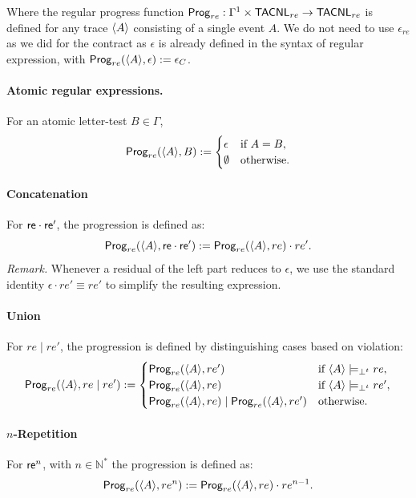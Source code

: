 \begin{definition}
Where the regular progress function $\mathsf{Prog}_{re}: \Gamma^1 \times \mathsf{TACNL}_{re} \to \mathsf{TACNL}_{re} $ is defined for any trace $\langle A \rangle $ consisting of a single event $A$.
 We do not need to use $\epsilon_{re}$ as we did for the contract as $\epsilon$ is already defined in the syntax of regular expression, with $\mathsf{Prog}_{re}(\langle A \rangle ,\epsilon):= \epsilon_C$.

 \paragraph{Atomic regular expressions.}
 For an atomic letter-test $B \in \Gamma$,
 \[
 \mathsf{Prog}_{re}(\langle A \rangle , B) :=
 \begin{cases}
 \epsilon & \text{if } A = B,\\
 \emptyset & \text{otherwise}.
 \end{cases}
 \]
  
 \paragraph{Concatenation}
For $\mathsf{re} \cdot \mathsf{re}'$, the progression is defined as:
\[
\mathsf{Prog}_{re}(\langle A \rangle , \mathsf{re} \cdot \mathsf{re}') := 
    \mathsf{Prog}_{re}(\langle A \rangle , re) \cdot re'.
\]
\noindent\emph{Remark.} Whenever a residual of the left part reduces to $\epsilon$, we use the standard identity $\epsilon \cdot re' \equiv re'$ to simplify the resulting expression.



\paragraph{Union}
For $re \mid re'$, the progression is defined by distinguishing cases based on violation:
\[
\mathsf{Prog}_{re}(\langle A \rangle , re \mid re') := \begin{cases} 
\mathsf{Prog}_{re}(\langle A \rangle , re') & \text{if } \langle A \rangle  \models_{\bot^t} re ,\\
\mathsf{Prog}_{re}(\langle A \rangle , re) & \text{if } \langle A \rangle  \models_{\bot^t} re' ,\\
\mathsf{Prog}_{re}(\langle A \rangle , re) \mid \mathsf{Prog}_{re}(\langle A \rangle , re') & \text{otherwise}.
\end{cases}
\]

\paragraph{$n$-Repetition}
For $\mathsf{re}^n$, with $n \in \mathbb{N}^*$ the progression is defined as:
\[
\mathsf{Prog}_{re}(\langle A \rangle , re^n) := \mathsf{Prog}_{re}(\langle A \rangle ,re)\cdot re^{n-1}.
\]



\end{definition}
